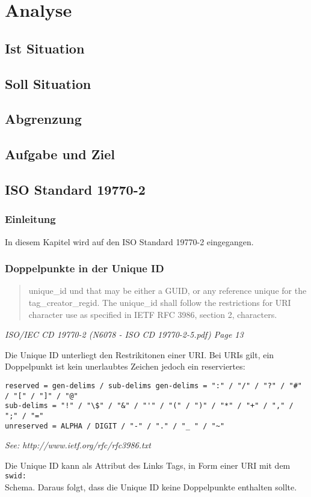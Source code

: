 \chapter{Analyse}

\section{Ist Situation}

\section{Soll Situation}

\section{Abgrenzung}

\section{Aufgabe und Ziel}

\section{ISO Standard 19770-2}
\subsection{Einleitung}

In diesem Kapitel wird auf den ISO Standard 19770-2 eingegangen. 

\subsection{Doppelpunkte in der Unique ID}
\begin{quote}
unique\_id und that may be either a GUID, or any reference unique for the tag\_creator\_regid. The unique\_id shall 
follow the restrictions for URI character use as specified in IETF RFC 3986, section 2, characters.
\end{quote}
\textit{ISO/IEC CD 19770-2 (N6078 - ISO CD 19770-2-5.pdf) Page 13}

Die Unique ID unterliegt den Restrikitonen einer URI. Bei URIs gilt, ein Doppelpunkt ist kein unerlaubtes Zeichen jedoch ein reserviertes: 

\begin{verbatim}
reserved = gen-delims / sub-delims gen-delims = ":" / "/" / "?" / "#" / "[" / "]" / "@" 
sub-delims = "!" / "\$" / "&" / "'" / "(" / ")" / "*" / "+" / "," / ";" / "="
unreserved = ALPHA / DIGIT / "-" / "." / "_ " / "~"
\end{verbatim}

\textit{See: http://www.ietf.org/rfc/rfc3986.txt}

Die Unique ID kann als Attribut des Links Tags, in Form einer URI mit dem \texttt{swid:\\} Schema. Daraus folgt, dass die Unique ID keine Doppelpunkte enthalten sollte.
